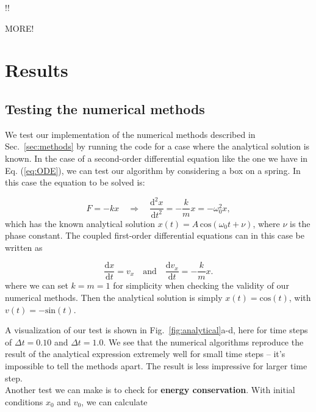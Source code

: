 \documentclass{article}
\begin{document}
\begin{multicols}{2}
!!

MORE!


\section{Results}

\subsection{Testing the numerical methods}\label{sec:analytical_test}

We test our implementation of the numerical methods described in Sec.~\ref{sec:methods} by running the code for a case where the analytical solution is known. In the case of a second-order differential equation like the one we have in Eq. (\ref{eq:ODE}), we can test our algorithm by considering a box on a spring. In this case the equation to be solved is:

\begin{equation}
	F = -kx \quad \Rightarrow \quad \frac{\mathrm{d}^2 x}{\mathrm{d}t^2} = - \frac{k}{m}x = - \omega_0^2 x,
\end{equation}
which has the known analytical solution $x(t) = A \, \mathrm{cos}(\omega_0 t + \nu)$, where $\nu$ is the phase constant. The coupled first-order differential equations can in this case be written as

\begin{equation}
	\frac{\mathrm{d}x}{\mathrm{d}t} = v_x  \quad \mathrm{and} \quad \frac{\mathrm{d}v_x}{\mathrm{d}t} = - \frac{k}{m} x.
\end{equation}
where we can set $k = m = 1$ for simplicity when checking the validity of our numerical methods. Then the analytical solution is simply $x(t) = \mathrm{cos}(t)$, with $v(t) = - \mathrm{sin}(t)$.

A visualization of our test is shown in Fig.~\ref{fig:analytical}a-d, here for time steps of $\Delta t = 0.10$ and $\Delta t = 1.0$. We see that the numerical algorithms reproduce the result of the analytical expression extremely well for small time steps -- it's impossible to tell the methods apart. The result is less impressive for larger time step.\\

\noindent Another test we can make is to check for \textbf{energy conservation}. With initial conditions $x_0$ and $v_0$, we can calculate


\end{multicols}
\end{document}
